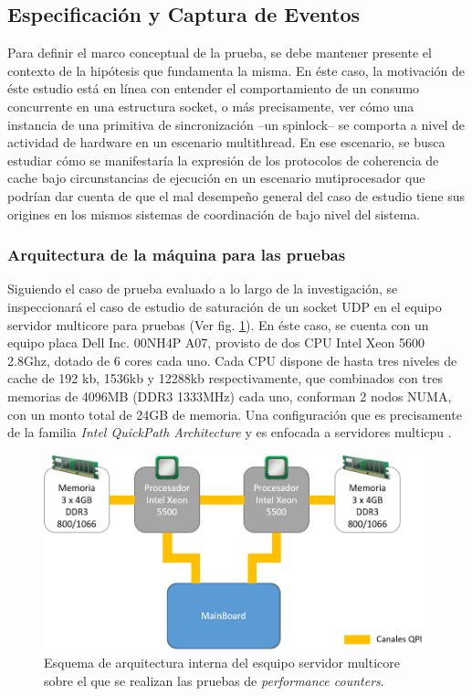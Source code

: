 \subsection{Especificación y Captura de Eventos}
Para definir el marco conceptual de la prueba, se debe mantener presente el contexto de la hipótesis que fundamenta la misma. En éste caso, la motivación de éste estudio está en línea con entender el comportamiento de un consumo concurrente en una estructura socket, o más precisamente, ver cómo una instancia de una primitiva de sincronización --un spinlock-- se comporta a nivel de actividad de hardware en un escenario multithread. En ese escenario, se busca estudiar cómo se manifestaría la expresión de los protocolos de coherencia de cache bajo circunstancias de ejecución en un escenario mutiprocesador que podrían dar cuenta de que el mal desempeño general del caso de estudio tiene sus origines en los mismos sistemas de coordinación de bajo nivel del sistema.

\subsubsection{Arquitectura de la máquina para las pruebas}
Siguiendo el caso de prueba evaluado a lo largo de la investigación, se inspeccionará el caso de estudio de saturación de un socket UDP en el equipo servidor multicore para pruebas (Ver fig. \ref{fig:hwspecs}). En éste caso, se cuenta con un equipo placa Dell Inc. 00NH4P A07, provisto de dos CPU Intel Xeon 5600 2.8Ghz, dotado de 6 cores cada uno. Cada CPU dispone de hasta tres niveles de cache de 192 kb, 1536kb y 12288kb respectivamente, que combinados con tres memorias de 4096MB (DDR3 1333MHz) cada uno, conforman 2 nodos NUMA, con un monto total de 24GB de memoria. Una configuración que es precisamente de la familia \emph{Intel QuickPath Architecture} y es enfocada a servidores multicpu \cite{report:intelxeon5600, manual:intelxeon5600}.

\begin{figure}[!h]
	\centering
	\includegraphics[scale=.7]{imagenes/arch24Cores.png}
	\caption{Esquema de arquitectura interna del esquipo servidor multicore sobre el que se realizan las pruebas de \emph{performance counters}.}
	\label{fig:hwspecs}
\end{figure}

